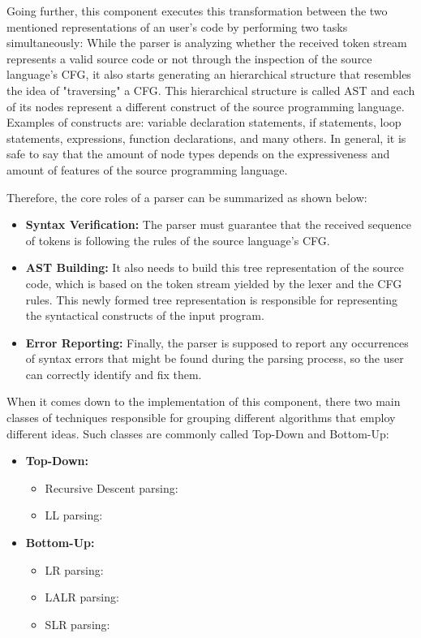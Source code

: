 Going further, this component executes this transformation between the two mentioned representations of an user's code by performing two tasks simultaneously: While the parser is analyzing whether the received token stream represents a valid source code or not through the inspection of the source language's CFG, it also starts generating an hierarchical structure that resembles the idea of "traversing" a CFG. This hierarchical structure is called AST and each of its nodes represent a different construct of the source programming language. Examples of constructs are: variable declaration statements, if statements, loop statements, expressions, function declarations, and many others. In general, it is safe to say that the amount of node types depends on the expressiveness and amount of features of the source programming language.

Therefore, the core roles of a parser can be summarized as shown below:
\begin{itemize}
    \item \textbf{Syntax Verification:} The parser must guarantee that the received sequence of tokens is following the rules of the source language's CFG.
    
    \item \textbf{AST Building:} It also needs to build this tree representation of the source code, which is based on the token stream yielded by the lexer and the CFG rules. This newly formed tree representation is responsible for representing the syntactical constructs of the input program.
    
    \item \textbf{Error Reporting:} Finally, the parser is supposed to report any occurrences of syntax errors that might be found during the parsing process, so the user can correctly identify and fix them.

\end{itemize}


When it comes down to the implementation of this component, there two main classes of techniques responsible for grouping different algorithms that employ different ideas. Such classes are commonly called Top-Down and Bottom-Up:
\begin{itemize}
    \item \textbf{Top-Down:}
        \begin{itemize}
            \item Recursive Descent parsing:
            \item LL parsing:
        \end{itemize}
    \item \textbf{Bottom-Up:}
        \begin{itemize}
            \item LR parsing:
            \item LALR parsing:
            \item SLR parsing:
        \end{itemize}
\end{itemize}


